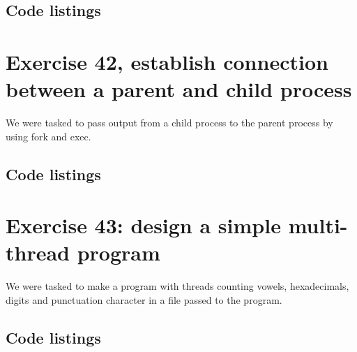 \documentclass[11pt]{article}
\begin{document}
\subsection*{Code listings}













\section*{Exercise 42, establish connection between a parent and child process}
We were tasked to pass output from a child process to the parent process by using fork and exec.

\subsection*{Code listings}




\section*{Exercise 43: design a simple multi-thread program}
We were tasked to make a program with threads counting vowels, hexadecimals, digits and punctuation character in a file passed to the program.

\subsection*{Code listings}








\end{document}
